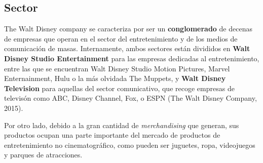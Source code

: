 \subsection{Sector}

The Walt Disney company se caracteriza por ser un \textbf{conglomerado} de decenas de empresas que operan en el sector del entretenimiento y de los medios de comunicación de masas. Internamente, ambos sectores están divididos en \textbf{Walt Disney Studio Entertainment} para las empresas dedicadas al entretenimiento, entre las que se encuentran Walt Disney Studio Motion Pictures, Marvel Enternainment, Hulu o la más olvidada The Muppets, y \textbf{Walt Disney Television} para aquellas del sector comunicativo, que recoge empresas de televisón como ABC, Disney Channel, Fox, o ESPN (The Walt Disney Company, 2015).

Por otro lado, debido a la gran cantidad de \textit{merchandising} que generan, sus productos ocupan una parte importante del mercado de productos de entretenimiento no cinematográfico, como pueden ser juguetes, ropa, videojuegos y parques de atracciones.